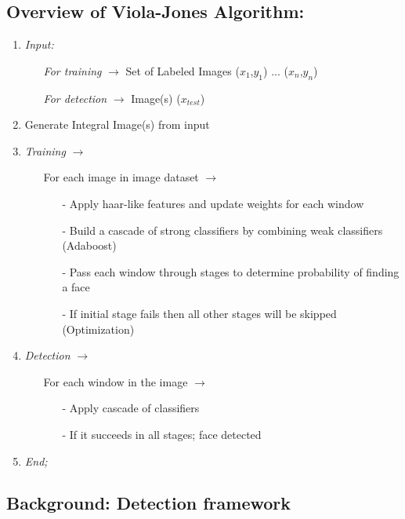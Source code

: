 \documentclass[12pt]{elsarticle}
\begin{document}
\subsection{\textbf{Overview of Viola-Jones Algorithm:}}
\begin{enumerate}
	\item \textit{Input:} 
    \begin{enumerate}
    	\item[] \textit{For training} $\to$ Set of Labeled Images ($x_1$,$y_1$) ... ($x_n$,$y_n$)
    	\item[] \textit{For detection} $\to$ Image(s) ($x_{test}$)
    \end{enumerate}
   	\item Generate Integral Image(s) from input
    \item \textit{Training} $\to$
    \begin{enumerate}
    \item[] For each image in image dataset $\to$ 
        \begin{enumerate}
			\item[-] Apply haar-like features and update weights for each window 
            \item[-] Build a cascade of strong classifiers by combining weak classifiers (Adaboost)
            \item[-] Pass each window through stages to determine probability of finding a face 
            \item[-] If initial stage fails then all other stages will be skipped (Optimization)
        \end{enumerate}
    \end{enumerate}
    \item \textit{Detection} $\to$
    \begin{enumerate}
    	\item[] For each window in the image $\to$
        \begin{enumerate}
			\item[-] Apply cascade of classifiers
			\item[-] If it succeeds in all stages; face detected
        \end{enumerate}
    \end{enumerate}
    \item \textit{End;}
\end{enumerate}

\subsection{\textbf{Background: Detection framework}}
\end{document}
